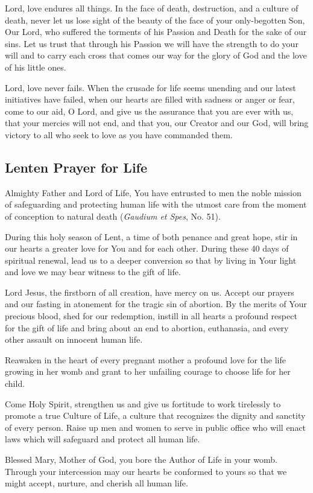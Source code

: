 \documentclass[12pt]{article}
\newcommand{\prayertitle}[1]{\subsection{#1}}
\begin{document}
Lord, love endures all things.
In the face of death, destruction, and a culture of death, never let us lose sight of the beauty of the face of your only-begotten Son, Our Lord, who suffered the torments of his Passion and Death for the sake of our sins.
Let us trust that through his Passion we will have the strength to do your will and to carry each cross that comes our way for the glory of God and the love of his little ones.

Lord, love never fails.
When the crusade for life seems unending and our latest initiatives have failed, when our hearts are filled with sadness or anger or fear, come to our aid, O Lord, and give us the assurance that you are ever with us, that your mercies will not end, and that you, our Creator and our God, will bring victory to all who seek to love as you have commanded them.

\prayertitle{Lenten Prayer for Life}
Almighty Father and Lord of Life,
You have entrusted to men the noble mission of safeguarding and protecting human life with the utmost care from the moment of conception to natural death (\textit{Gaudium et Spes}, No. 51).

During this holy season of Lent, a time of both penance and great hope, stir in our hearts a greater love for You and for each other.
During these 40 days of spiritual renewal, lead us to a deeper conversion so that by living in Your light and love we may bear witness to the gift of life.

Lord Jesus, the firstborn of all creation, have mercy on us. 
Accept our prayers and our fasting in atonement for the tragic sin of abortion. 
By the merits of Your precious blood, shed for our redemption, instill in all hearts a profound respect for the gift of life and bring about an end to abortion, euthanasia, and every other assault on innocent human life.

Reawaken in the heart of every pregnant mother a profound love for the life growing in her womb and grant to her unfailing courage to choose life for her child.

Come Holy Spirit, strengthen us and give us fortitude to work tirelessly to promote a true Culture of Life, a culture that recognizes the dignity and sanctity of every person.
Raise up men and women to serve in public office who will enact laws which will safeguard and protect all human life.

Blessed Mary, Mother of God, you bore the Author of Life in your womb. 
Through your intercession may our hearts be conformed to yours so that we might accept, nurture, and cherish all human life.
\end{document}
